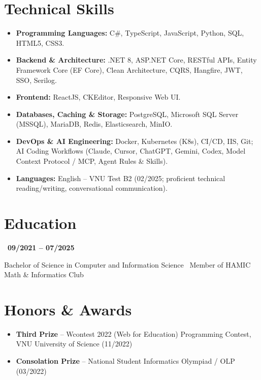 \documentclass[a4paper,9.5pt]{article}
\begin{document}
\section{Technical Skills}
\begin{itemize}
    \item \textbf{Programming Languages:} C\#, TypeScript, JavaScript, Python, SQL, HTML5, CSS3.
    \item \textbf{Backend \& Architecture:} .NET 8, ASP.NET Core, RESTful APIs, Entity Framework Core (EF Core), Clean Architecture, CQRS, Hangfire, JWT, SSO, Serilog.
    \item \textbf{Frontend:} ReactJS, CKEditor, Responsive Web UI.
    \item \textbf{Databases, Caching \& Storage:} PostgreSQL, Microsoft SQL Server (MSSQL), MariaDB, Redis, Elasticsearch, MinIO.
    \item \textbf{DevOps \& AI Engineering:} Docker, Kubernetes (K8s), CI/CD, IIS, Git; AI Coding Workflows (Claude, Cursor, ChatGPT, Gemini, Codex, Model Context Protocol / MCP, Agent Rules \& Skills).
    \item \textbf{Languages:} English -- VNU Test B2 (02/2025; proficient technical reading/writing, conversational communication).
\end{itemize}

\section{Education}
 \textbar\ \textbf{09/2021 -- 07/2025}\par\nopagebreak
\noindent Bachelor of Science in Computer and Information Science \textbar\ Member of HAMIC Math \& Informatics Club\par

\section{Honors \& Awards}
\begin{itemize}
    \item \textbf{Third Prize} -- Wcontest 2022 (Web for Education) Programming Contest, VNU University of Science (11/2022)
    \item \textbf{Consolation Prize} -- National Student Informatics Olympiad / OLP (03/2022)
\end{itemize}
\end{document}
